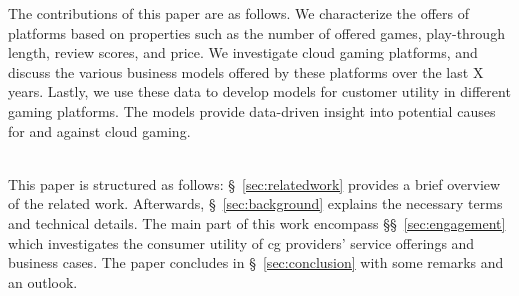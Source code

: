 
The contributions of this paper are as follows.
We characterize the offers of platforms based on properties such
as the number of offered games, play-through length, review scores,
and price.
We investigate cloud gaming platforms, and discuss the various
business models offered by these platforms over the last X years.
Lastly, we use these data to develop models for customer utility
in different gaming platforms. The models provide data-driven
insight into potential causes for and against cloud gaming.


~\\
This paper is structured as follows: §~\ref{sec:relatedwork} provides a
brief overview of the related work. Afterwards, §~\ref{sec:background}
explains the necessary terms and technical details. The main part of
this work encompass §§~\ref{sec:engagement} which investigates
the consumer utility of \gls{cg} providers' service offerings
and business cases.
The paper concludes in §~\ref{sec:conclusion} with some
remarks and an outlook.



